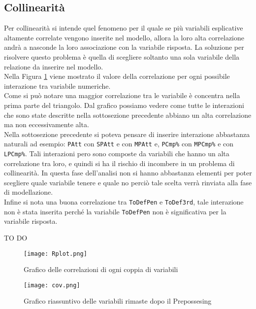 \subsection{Collinearità}
Per collinearità si intende quel fenomeno per il quale se più variabili esplicative altamente correlate vengono inserite nel modello, allora la loro alta correlazione andrà a nasconde la loro associazione con la variabile risposta. La soluzione per risolvere questo problema è quella di scegliere soltanto una sola variabile della relazione da inserire nel modello.\\
Nella Figura \ref{fig:cor} viene mostrato il valore della correlazione per ogni possibile interazione tra variabile numeriche.\\
Come si può notare una maggior correlazione tra le variabile è concentra nella prima parte del triangolo. Dal grafico possiamo vedere come tutte le interazioni che sono state descritte nella sottosezione precedente abbiano un alta correlazione ma non eccessivamente alta. \\
Nella sottosezione precedente si poteva pensare di inserire interazione abbastanza naturali ad esempio: \texttt{PAtt} con \texttt{SPAtt} e con \texttt{MPAtt} e, \texttt{PCmp\%} con \texttt{MPCmp\%} e con \texttt{LPCmp\%}. Tali interazioni pero sono composte da variabili che hanno un alta correlazione tra loro, e quindi si ha il rischio di incombere in un problema di collinearità. In questa fase dell'analisi non si hanno abbastanza elementi per poter scegliere quale variabile tenere e quale no perciò tale scelta verrà rinviata alla fase di modellazione.\\
Infine si nota una buona correlazione tra \texttt{ToDefPen} e \texttt{ToDef3rd}, tale interazione non è stata inserita perché la variabile \texttt{ToDefPen} non è significativa per la variabile risposta.

TO DO

\begin{figure}[htbp]
	\begin{center}
		\texttt{[image: Rplot.png]}
		\caption{Grafico delle correlazioni di ogni coppia di variabili}  \label{fig:cor}
	\end{center}
\end{figure}

\begin{figure}[htbp]
	\begin{center}
		\texttt{[image: cov.png]}
		\caption{Grafico riassuntivo delle variabili rimaste dopo il Prepossesing}  \label{fig:cov}
	\end{center}
\end{figure}

